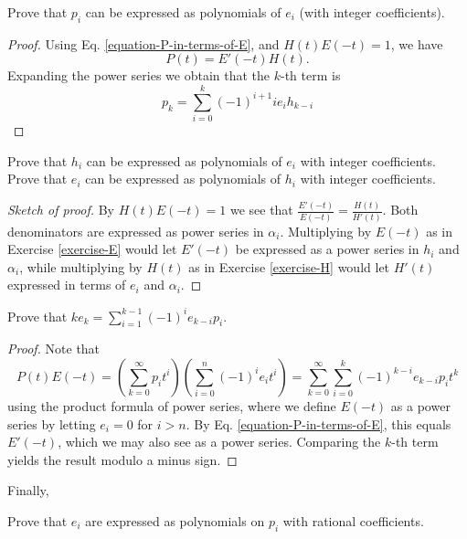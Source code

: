 \begin{exercise}
\label{exercise-p-polynomials-of-e}
Prove that $p_i$ can be expressed as polynomials of $e_i$ (with integer
coefficients).
\end{exercise}

\begin{proof}
Using Eq. \ref{equation-P-in-terms-of-E}, and $H(t)E(-t)=1$, we have
$$
P(t)=E'(-t)H(t).
$$
Expanding the power series we obtain that the $k$-th term is
$$
p_k=\sum_{i=0}^k(-1)^{i+1}ie_ih_{k-i}
$$
\end{proof}

\begin{exercise}
\label{exercise-h-and-e}
Prove that $h_i$ can be expressed as polynomials of $e_i$ with integer
coefficients. Prove that $e_i$ can be expressed as polynomials of $h_i$ with
integer coefficients.
\end{exercise}

\begin{proof}[Sketch of proof]
By $H(t)E(-t)=1$ we see that $\frac{E'(-t)}{E(-t)}=\frac{H(t)}{H'(t)}$. Both
denominators are expressed as power series in $\alpha_i$. Multiplying by $E(-t)$
as in Exercise \ref{exercise-E} 
would let $E'(-t)$ be expressed as a power series in $h_i$ and
$\alpha_i$, while multiplying by $H(t)$ as in Exercise \ref{exercise-H} would 
let $H'(t)$ expressed in terms of
$e_i$ and $\alpha_i$.
\end{proof}

\begin{exercise}
\label{exercise-Newton-formula}
Prove that $ke_k=\sum_{i=1}^{k-1}(-1)^ie_{k-i}p_i$.
\end{exercise}

\begin{proof}
Note that
$$
P(t)E(-t)=\left(\sum_{k=0}^{\infty} p_it^i\right)
\left(\sum_{i=0}^n(-1)^ie_it^i\right)
=\sum_{k=0}^\infty \sum_{i=0}^k (-1)^{k-i}e_{k-i}p_it^k
$$
using the product formula of power series, where we define $E(-t)$ as a power
series by letting $e_i=0$ for $i>n$. By Eq. \ref{equation-P-in-terms-of-E}, this
equals $E'(-t)$, which we may also see as a power series. Comparing the $k$-th
term yields the result modulo a minus sign.
\end{proof}

Finally,

\begin{exercise}
\label{exercise-symmetric-polynomials-in-terms-of-Newton-polynomials}
Prove that $e_i$ are expressed as polynomials on $p_i$ with rational
coefficients.
\end{exercise}

